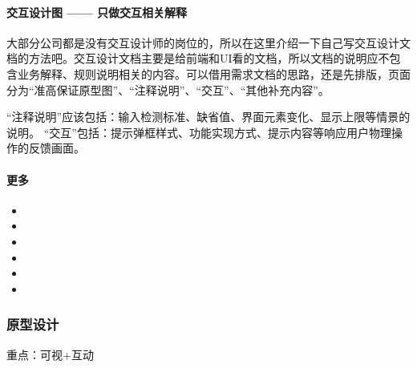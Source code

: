 \documentclass[letterpaper,11pt,english]{sphinxmanual}
\begin{document}
\paragraph{交互设计图 —— 只做交互相关解释}
\label{\detokenize{chapter_knowledge/static_page:id3}}
大部分公司都是没有交互设计师的岗位的，所以在这里介绍一下自己写交互设计文档的方法吧。交互设计文档主要是给前端和UI看的文档，所以文档的说明应不包含业务解释、规则说明相关的内容。可以借用需求文档的思路，还是先排版，页面分为“准高保证原型图”、“注释说明”、“交互”、“其他补充内容”。%
\begin{footnote}[530]\sphinxAtStartFootnote
{}
%
\end{footnote}

“注释说明”应该包括：输入检测标准、缺省值、界面元素变化、显示上限等情景的说明。
“交互”包括：提示弹框样式、功能实现方式、提示内容等响应用户物理操作的反馈画面。


\paragraph{更多}
\label{\detokenize{chapter_knowledge/static_page:id4}}\begin{itemize}
\item {} 

\item {} 

\item {} 

\item {} 

\item {} 

\item {} 

\end{itemize}


\subsubsection{原型设计}
\label{\detokenize{chapter_knowledge/prototype_design:id1}}\label{\detokenize{chapter_knowledge/prototype_design::doc}}
重点：可视+互动
\end{document}
